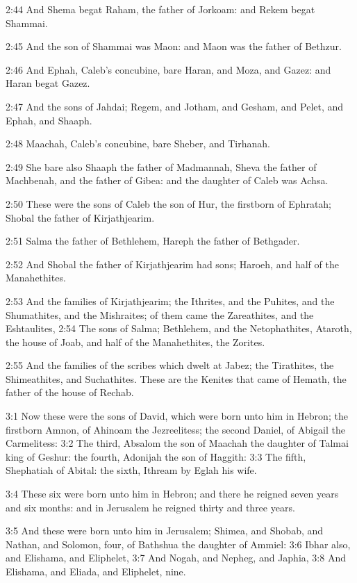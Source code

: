 2:44 And Shema begat Raham, the father of Jorkoam: and Rekem begat
Shammai.

2:45 And the son of Shammai was Maon: and Maon was the father of
Bethzur.

2:46 And Ephah, Caleb's concubine, bare Haran, and Moza, and Gazez:
and Haran begat Gazez.

2:47 And the sons of Jahdai; Regem, and Jotham, and Gesham, and Pelet,
and Ephah, and Shaaph.

2:48 Maachah, Caleb's concubine, bare Sheber, and Tirhanah.

2:49 She bare also Shaaph the father of Madmannah, Sheva the father of
Machbenah, and the father of Gibea: and the daughter of Caleb was
Achsa.

2:50 These were the sons of Caleb the son of Hur, the firstborn of
Ephratah; Shobal the father of Kirjathjearim.

2:51 Salma the father of Bethlehem, Hareph the father of Bethgader.

2:52 And Shobal the father of Kirjathjearim had sons; Haroeh, and half
of the Manahethites.

2:53 And the families of Kirjathjearim; the Ithrites, and the Puhites,
and the Shumathites, and the Mishraites; of them came the Zareathites,
and the Eshtaulites, 2:54 The sons of Salma; Bethlehem, and the
Netophathites, Ataroth, the house of Joab, and half of the
Manahethites, the Zorites.

2:55 And the families of the scribes which dwelt at Jabez; the
Tirathites, the Shimeathites, and Suchathites. These are the Kenites
that came of Hemath, the father of the house of Rechab.

3:1 Now these were the sons of David, which were born unto him in
Hebron; the firstborn Amnon, of Ahinoam the Jezreelitess; the second
Daniel, of Abigail the Carmelitess: 3:2 The third, Absalom the son of
Maachah the daughter of Talmai king of Geshur: the fourth, Adonijah
the son of Haggith: 3:3 The fifth, Shephatiah of Abital: the sixth,
Ithream by Eglah his wife.

3:4 These six were born unto him in Hebron; and there he reigned seven
years and six months: and in Jerusalem he reigned thirty and three
years.

3:5 And these were born unto him in Jerusalem; Shimea, and Shobab, and
Nathan, and Solomon, four, of Bathshua the daughter of Ammiel: 3:6
Ibhar also, and Elishama, and Eliphelet, 3:7 And Nogah, and Nepheg,
and Japhia, 3:8 And Elishama, and Eliada, and Eliphelet, nine.

